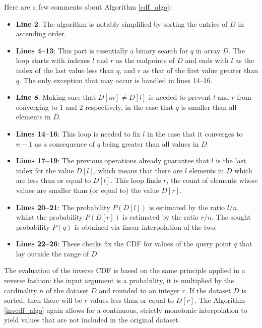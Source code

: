 \documentclass[10pt,final]{siamltex}
\begin{document}
Here are a few comments about Algorithm \ref{cdf_algo}:
\begin{itemize}
  \item \textbf{Line 2}: The algorithm is notably simplified by sorting the entries of $D$ in ascending order.
  \item \textbf{Lines 4--13}: This part is essentially a binary search for $q$ in array $D$. The loop starts with indexes $l$ and $r$ as the endpoints of $D$ and ends with $l$ as the index of the last value less than $q$, and $r$ as that of the first value greater than $q$. The only exception that may occur is handled in lines 14--16.
  \item \textbf{Line 8}: Making sure that $D[m]\neq D[l]$ is needed to prevent $l$ and $r$ from converging to $1$ and $2$ respectively, in the case that $q$ is smaller than all elements in $D$.
  \item \textbf{Lines 14--16}: This loop is needed to fix $l$ in the case that it converges to $n-1$ as a consequence of $q$ being greater than all values in $D$.
  \item \textbf{Lines 17--19}: The previous operations already guarantee that $l$ is the last index for the value $D[l]$, which means that there are $l$ elements in $D$ which are less than or equal to $D[l]$. This loop finds $r$, the count of elements whose values are smaller than (or equal to) the value $D[r]$.
  \item \textbf{Lines 20--21}: The probability $P(D[l])$ is estimated by the ratio $l/n$, whilst the probability $P(D[r])$ is estimated by the ratio $r/n$. The sought probability $P(q)$ is obtained via linear interpolation of the two.
  \item \textbf{Lines 22--26}: These checks fix the CDF for values of the query point $q$ that lay outside the range of $D$.
\end{itemize}
%

The evaluation of the inverse CDF is based on the same principle applied in a reverse fashion: the input argument is a probability, it is multiplied by the cardinality $n$ of the dataset $D$ and rounded to an integer $r$. If the dataset $D$ is sorted, then there will be $r$ values less than or equal to $D[r]$. The Algorithm \ref{invcdf_algo} again allows for a continuous, strictly monotonic interpolation to yield values that are not included in the original dataset.
\end{document}
